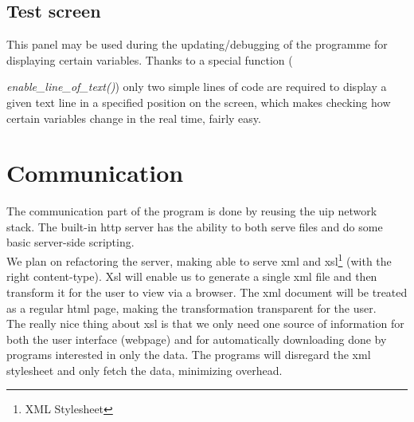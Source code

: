 \subsection{Test screen}
This panel may be used during the updating/debugging of the programme for displaying certain variables. Thanks to a special function ({\textit{enable\_line\_of\_text()}) only two simple lines of code are required to display a given text line in a specified position on the screen, which makes checking how certain variables change in the real time, fairly easy.

\section{Communication}
The communication part of the program is done by reusing the uip network stack. The built-in http server has the ability to both serve files and do some basic server-side scripting. \\
We plan on refactoring the server, making able to serve xml and xsl\footnote{XML Stylesheet} (with the right content-type). Xsl will enable us to generate a single xml file and then transform it for the user to view via a browser. The xml document will be treated as a regular html page, making the transformation transparent for the user. \\
The really nice thing about xsl is that we only need one source of information for both the user interface (webpage) and for automatically downloading done by programs interested in only the data. The programs will disregard the xml stylesheet and only fetch the data, minimizing overhead.
}
